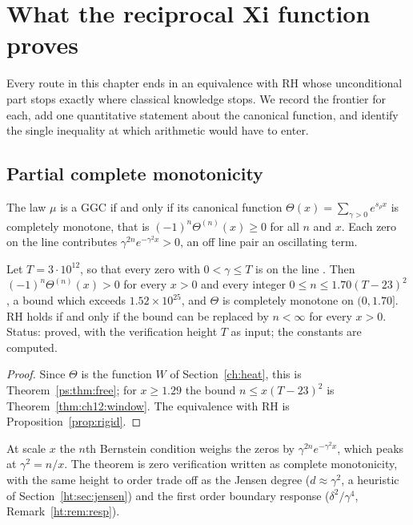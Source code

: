 \section{What the reciprocal Xi function proves}\label{ht:sec:frontier}

Every route in this chapter ends in an equivalence with RH whose unconditional part stops exactly where classical knowledge stops. We record the frontier for each, add one quantitative statement about the canonical function, and identify the single inequality at which arithmetic would have to enter.

\subsection{Partial complete monotonicity}
The law $\mu$ is a GGC if and only if its canonical function $\Theta(x)=\sum_{\gamma>0}e^{s_\rho x}$ is completely monotone, that is $(-1)^n\Theta^{(n)}(x)\ge0$ for all $n$ and $x$. Each zero on the line contributes $\gamma^{2n}e^{-\gamma^2x}>0$, an off line pair an oscillating term.

\begin{theorem}\label{ht:thm:partialcm}
Let $T=3\cdot10^{12}$, so that every zero with $0<\gamma\le T$ is on the line \cite{PT21}. Then $(-1)^n\Theta^{(n)}(x)>0$ for every $x>0$ and every integer $0\le n\le1.70(T-23)^2$, a bound which exceeds $1.52\times10^{25}$, and $\Theta$ is completely monotone on $(0,1.70]$. RH holds if and only if the bound can be replaced by $n<\infty$ for every $x>0$. Status: proved, with the verification height $T$ as input; the constants are computed.
\end{theorem}

\begin{proof}
Since $\Theta$ is the function $W$ of Section~\ref{ch:heat}, this is Theorem~\ref{ps:thm:free}; for $x\ge1.29$ the bound $n\le x(T-23)^2$ is Theorem~\ref{thm:ch12:window}. The equivalence with RH is Proposition~\ref{prop:rigid}.
\end{proof}

At scale $x$ the $n$th Bernstein condition weighs the zeros by $\gamma^{2n}e^{-\gamma^2x}$, which peaks at $\gamma^2=n/x$. The theorem is zero verification written as complete monotonicity, with the same height to order trade off as the Jensen degree ($d\approx\gamma^2$, a heuristic of Section~\ref{ht:sec:jensen}) and the first order boundary response ($\delta^2/\gamma^4$, Remark~\ref{ht:rem:resp}).

